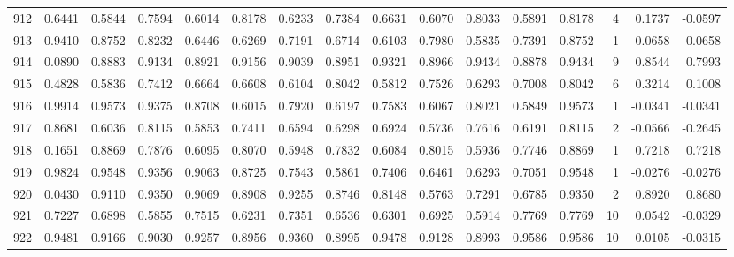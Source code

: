\begin{tabular}{lrrrrrrrrrrrrrrr}
912 &      0.6441 &  0.5844 &  0.7594 &  0.6014 &  0.8178 &  0.6233 &  0.7384 &  0.6631 &  0.6070 &  0.8033 &   0.5891 &     0.8178 &      4 &                    0.1737 &                    -0.0597 \\
913 &      0.9410 &  0.8752 &  0.8232 &  0.6446 &  0.6269 &  0.7191 &  0.6714 &  0.6103 &  0.7980 &  0.5835 &   0.7391 &     0.8752 &      1 &                   -0.0658 &                    -0.0658 \\
914 &      0.0890 &  0.8883 &  0.9134 &  0.8921 &  0.9156 &  0.9039 &  0.8951 &  0.9321 &  0.8966 &  0.9434 &   0.8878 &     0.9434 &      9 &                    0.8544 &                     0.7993 \\
915 &      0.4828 &  0.5836 &  0.7412 &  0.6664 &  0.6608 &  0.6104 &  0.8042 &  0.5812 &  0.7526 &  0.6293 &   0.7008 &     0.8042 &      6 &                    0.3214 &                     0.1008 \\
916 &      0.9914 &  0.9573 &  0.9375 &  0.8708 &  0.6015 &  0.7920 &  0.6197 &  0.7583 &  0.6067 &  0.8021 &   0.5849 &     0.9573 &      1 &                   -0.0341 &                    -0.0341 \\
917 &      0.8681 &  0.6036 &  0.8115 &  0.5853 &  0.7411 &  0.6594 &  0.6298 &  0.6924 &  0.5736 &  0.7616 &   0.6191 &     0.8115 &      2 &                   -0.0566 &                    -0.2645 \\
918 &      0.1651 &  0.8869 &  0.7876 &  0.6095 &  0.8070 &  0.5948 &  0.7832 &  0.6084 &  0.8015 &  0.5936 &   0.7746 &     0.8869 &      1 &                    0.7218 &                     0.7218 \\
919 &      0.9824 &  0.9548 &  0.9356 &  0.9063 &  0.8725 &  0.7543 &  0.5861 &  0.7406 &  0.6461 &  0.6293 &   0.7051 &     0.9548 &      1 &                   -0.0276 &                    -0.0276 \\
920 &      0.0430 &  0.9110 &  0.9350 &  0.9069 &  0.8908 &  0.9255 &  0.8746 &  0.8148 &  0.5763 &  0.7291 &   0.6785 &     0.9350 &      2 &                    0.8920 &                     0.8680 \\
921 &      0.7227 &  0.6898 &  0.5855 &  0.7515 &  0.6231 &  0.7351 &  0.6536 &  0.6301 &  0.6925 &  0.5914 &   0.7769 &     0.7769 &     10 &                    0.0542 &                    -0.0329 \\
922 &      0.9481 &  0.9166 &  0.9030 &  0.9257 &  0.8956 &  0.9360 &  0.8995 &  0.9478 &  0.9128 &  0.8993 &   0.9586 &     0.9586 &     10 &                    0.0105 &                    -0.0315 \\

\end{tabular}
